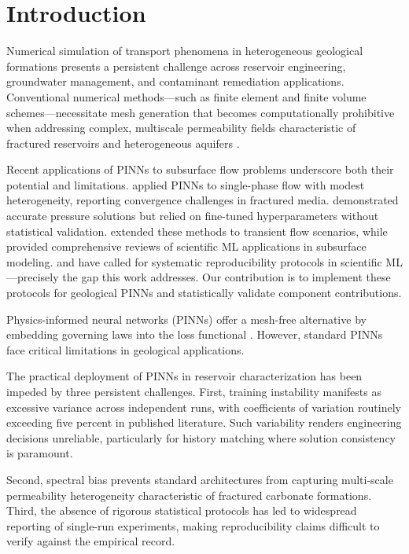 \documentclass[sn-mathphys]{sn-jnl}
\begin{document}
	\section{Introduction}
	\label{sec:intro}
	
	Numerical simulation of transport phenomena in heterogeneous geological formations presents a persistent challenge across reservoir engineering, groundwater management, and contaminant remediation applications. Conventional numerical methods—such as finite element and finite volume schemes—necessitate mesh generation that becomes computationally prohibitive when addressing complex, multiscale permeability fields characteristic of fractured reservoirs and heterogeneous aquifers \citep{podlubny1999fractional, mainardi2010fractional, abate2017geological}.
	
	Recent applications of PINNs to subsurface flow problems underscore both their potential and limitations. \citet{tartakovsky2018learning} applied PINNs to single-phase flow with modest heterogeneity, reporting convergence challenges in fractured media. \citet{wang2020physics} demonstrated accurate pressure solutions but relied on fine-tuned hyperparameters without statistical validation. \citet{tartakovsky2020physics} extended these methods to transient flow scenarios, while \citet{karniadakis2021physics} provided comprehensive reviews of scientific ML applications in subsurface modeling. \citet{cranmer2020frontier} and \citet{pineau2021improving} have called for systematic reproducibility protocols in scientific ML—precisely the gap this work addresses. Our contribution is to implement these protocols for geological PINNs and statistically validate component contributions.
	
	Physics-informed neural networks (PINNs) offer a mesh-free alternative by embedding governing laws into the loss functional \citep{raissi2019physics}. However, standard PINNs face critical limitations in geological applications.
	
	The practical deployment of PINNs in reservoir characterization has been impeded by three persistent challenges. First, training instability manifests as excessive variance across independent runs, with coefficients of variation routinely exceeding five percent in published literature. Such variability renders engineering decisions unreliable, particularly for history matching where solution consistency is paramount.
	
	Second, spectral bias prevents standard architectures from capturing multi-scale permeability heterogeneity characteristic of fractured carbonate formations. Third, the absence of rigorous statistical protocols has led to widespread reporting of single-run experiments, making reproducibility claims difficult to verify against the empirical record.
	
\end{document}
